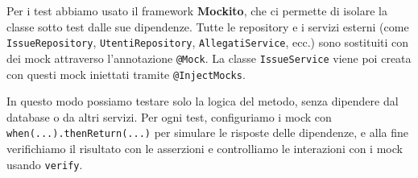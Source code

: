 Per i test abbiamo usato il framework \textbf{Mockito}, che ci permette di isolare la classe sotto test dalle sue dipendenze.
Tutte le repository e i servizi esterni (come \texttt{IssueRepository}, \texttt{UtentiRepository}, \texttt{AllegatiService}, ecc.) sono sostituiti con dei mock attraverso l'annotazione \texttt{@Mock}.
La classe \texttt{IssueService} viene poi creata con questi mock iniettati tramite \texttt{@InjectMocks}.

In questo modo possiamo testare solo la logica del metodo, senza dipendere dal database o da altri servizi.
Per ogni test, configuriamo i mock con \texttt{when(...).thenReturn(...)} per simulare le risposte delle dipendenze, e alla fine verifichiamo il risultato con le asserzioni e controlliamo le interazioni con i mock usando \texttt{verify}.